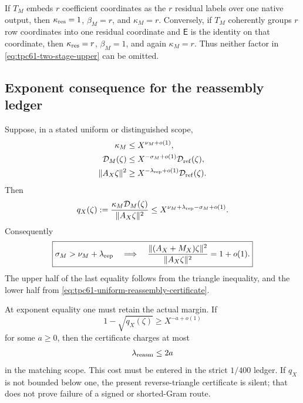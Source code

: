 \begin{example}
\label{ex:tpc61-two-stage-sharpness}
If \(T_M\) embeds \(r\) coefficient coordinates as the \(r\) residual
labels over one native output, then
\(\kappa_{\rm res}=1\), \(\beta_M=r\), and \(\kappa_M=r\).  Conversely,
if \(T_M\) coherently groups \(r\) row coordinates into one residual
coordinate and \(\mathsf E\) is the identity on that coordinate, then
\(\kappa_{\rm res}=r\), \(\beta_M=1\), and again \(\kappa_M=r\).
Thus neither factor in \eqref{eq:tpc61-two-stage-upper} can be omitted.
\end{example}

\subsection{Exponent consequence for the reassembly ledger}

Suppose, in a stated uniform or distinguished scope,
\begin{align}
 \kappa_M&\le X^{\nu_M+o(1)},
 \label{eq:tpc61-effective-degree-exponent}\\
 \mathcal D_M(\zeta)
 &\le X^{-\sigma_M+o(1)}\mathcal D_{\rm ref}(\zeta),
 \label{eq:tpc61-missing-mass-saving}\\
 \|A_X\zeta\|^2
 &\ge X^{-\lambda_{\rm rep}+o(1)}
       \mathcal D_{\rm ref}(\zeta).
 \label{eq:tpc61-represented-reference-lower}
\end{align}
Then
\begin{equation}
 q_X(\zeta)
 :=\frac{\kappa_M\mathcal D_M(\zeta)}
          {\|A_X\zeta\|^2}
 \le
 X^{\nu_M+\lambda_{\rm rep}-\sigma_M+o(1)}.
 \label{eq:tpc61-effective-product}
\end{equation}
Consequently
\begin{equation}
 \boxed{
 \sigma_M>\nu_M+\lambda_{\rm rep}
 \quad\Longrightarrow\quad
 \frac{\|(A_X+M_X)\zeta\|^2}{\|A_X\zeta\|^2}
 =1+o(1).}
 \label{eq:tpc61-zero-cost-effective-degree}
\end{equation}
The upper half of the last equality follows from the triangle inequality,
and the lower half from
\eqref{eq:tpc61-uniform-reassembly-certificate}.

At exponent equality one must retain the actual margin.  If
\begin{equation}
 1-\sqrt{q_X(\zeta)}\ge X^{-a+o(1)}
 \label{eq:tpc61-critical-margin}
\end{equation}
for some \(a\ge0\), then the certificate charges at most
\begin{equation}
 \lambda_{\rm reasm}\le2a
 \label{eq:tpc61-critical-reassembly-cost}
\end{equation}
in the matching scope.  This cost must be entered in the strict
\(1/400\) ledger.  If \(q_X\) is not bounded below one, the present
reverse-triangle certificate is silent; that does not prove failure of a
signed or shorted-Gram route.

